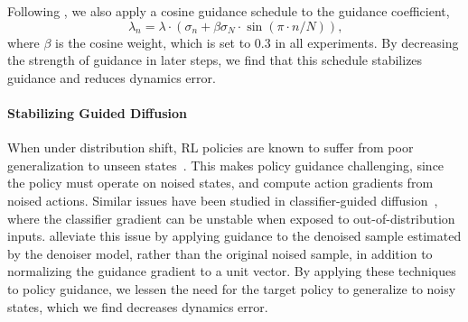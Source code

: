 \documentclass[10pt]{article} %
\theoremstyle{plain}
\theoremstyle{definition}
\theoremstyle{remark}
\begin{document}
Following \citet{ma2023elucidating}, we also apply a cosine guidance schedule to the guidance coefficient,
\begin{equation}
    \lambda_n = \lambda \cdot (\sigma_n + \beta \sigma_N \cdot \sin(\pi \cdot n/N))\text{,}
\end{equation}
where $\beta$ is the cosine weight, which is set to 0.3 in all experiments.
By decreasing the strength of guidance in later steps, we find that this schedule stabilizes guidance and reduces dynamics error.




\paragraph{Stabilizing Guided Diffusion}
When under distribution shift, RL policies are known to suffer from poor generalization to unseen states~\citep{Kirk_2023}. This makes policy guidance challenging, since the policy must operate on noised states, and compute action gradients from noised actions. Similar issues have been studied in classifier-guided diffusion~\citep{ma2023elucidating}, where the classifier gradient can be unstable when exposed to out-of-distribution inputs. \citet{bansal2023universal} alleviate this issue by applying guidance to the denoised sample estimated by the denoiser model, rather than the original noised sample, in addition to normalizing the guidance gradient to a unit vector. By applying these techniques to policy guidance, we lessen the need for the target policy to generalize to noisy states, which we find decreases dynamics error.
\end{document}
